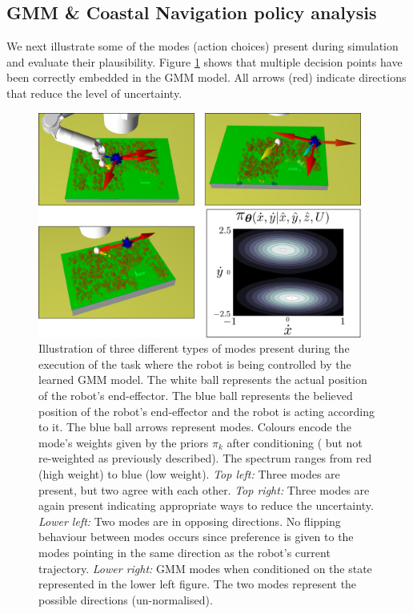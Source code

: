 \FloatBarrier
\subsection{GMM \& Coastal Navigation policy analysis}\label{sub:policy_analysis}

We next illustrate some of the modes (action choices) present during simulation and evaluate their 
plausibility. Figure \ref{fig:modes} shows that multiple decision points have been correctly embedded in the GMM model. All
arrows (red) indicate directions that reduce the level of uncertainty. 

\begin{figure}
    \centering
    \includegraphics[width=0.95\textwidth]{./ch3-Search/Figures/Figure9_m}
    \caption{Illustration of three different types of modes present during the
    execution of the task where the robot is being controlled by the learned GMM model.
    The white ball represents the actual position of the robot's end-effector. The blue ball represents the
    believed position of the robot's end-effector and the robot is acting according to it. 
    The blue ball arrows represent modes. Colours encode the mode's weights given by the priors $\pi_{k}$ after conditioning ( but not re-weighted as
    previously described). The spectrum ranges from red (high weight) to blue (low weight). \textit{Top left:} Three modes are present, but two agree with each other.   
    \textit{Top right:} Three modes are again present indicating appropriate ways to reduce the uncertainty. \textit{Lower left:} Two modes are in opposing directions. 
    No flipping behaviour between modes occurs since preference is given to the modes pointing in the same direction as the robot's current trajectory. \textit{Lower right:} GMM modes when conditioned on the state represented in the lower left figure.
    The two modes represent the possible directions (un-normalised).}
   \label{fig:modes}
\end{figure}

